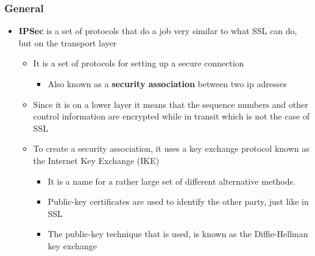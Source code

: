 \documentclass[11pt]{article}
\begin{document}
\subsubsection{General}
\label{sec:org8064fca}
\begin{itemize}
\item \textbf{IPSec} is a set of protocols that do a job very similar to what SSL can do, but on the transport layer
\begin{itemize}
\item It is a set of protocols for setting up a secure connection
\begin{itemize}
\item Also known as a \textbf{security association} between two ip adresses
\end{itemize}
\item Since it is on a lower layer it means that the sequence numbers and other control information are encrypted while in transit which is not the case of SSL
\item To create a security association, it uses a key exchange protocol known as the Internet Key Exchange (IKE)
\begin{itemize}
\item It is a name for a rather large set of different alternative methods.
\item Public-key certificates are used to identify the other party, just like in SSL
\item The public-key technique that is used, is known as the Diffie-Hellman key exchange
\end{itemize}
\end{itemize}
\end{itemize}
\end{document}

